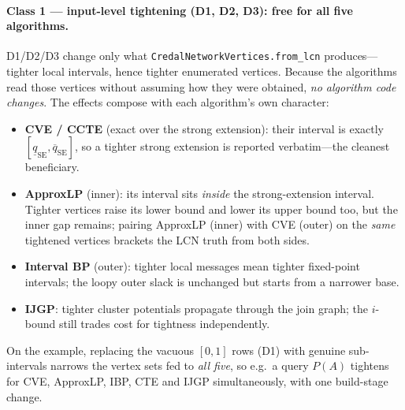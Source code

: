 \documentclass[11pt]{article}
\begin{document}
\paragraph{Class 1 --- input-level tightening (D1, D2, D3): free for all five algorithms.}
D1/D2/D3 change only what \texttt{CredalNetworkVertices.from\_lcn} produces---tighter local
intervals, hence tighter enumerated vertices. Because the algorithms read those vertices
without assuming how they were obtained, \emph{no algorithm code changes}. The effects
compose with each algorithm's own character:
\begin{itemize}
  \item \textbf{CVE / CCTE} (exact over the strong extension): their interval is exactly
    $[\underline{q}_{\mathrm{SE}},\overline{q}_{\mathrm{SE}}]$, so a tighter strong
    extension is reported verbatim---the cleanest beneficiary.
  \item \textbf{ApproxLP} (inner): its interval sits \emph{inside} the strong-extension
    interval. Tighter vertices raise its lower bound and lower its upper bound too, but the
    inner gap remains; pairing ApproxLP (inner) with CVE (outer) on the \emph{same} tightened
    vertices brackets the LCN truth from both sides.
  \item \textbf{Interval BP} (outer): tighter local messages mean tighter fixed-point
    intervals; the loopy outer slack is unchanged but starts from a narrower base.
  \item \textbf{IJGP}: tighter cluster potentials propagate through the join graph; the
    $i$-bound still trades cost for tightness independently.
\end{itemize}
On the example, replacing the vacuous $[0,1]$ rows (D1) with genuine sub-intervals narrows
the vertex sets fed to \emph{all five}, so e.g.\ a query $P(A)$ tightens for CVE, ApproxLP,
IBP, CTE and IJGP simultaneously, with one build-stage change.
\end{document}
